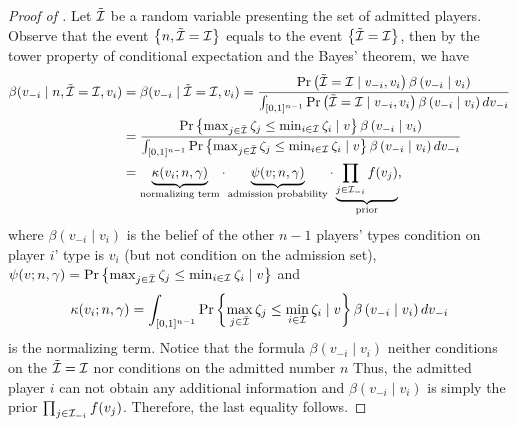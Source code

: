\begin{proof}[Proof of ] Let
$\tilde{\mathcal{I}}$ be a random variable presenting the set of admitted players. Observe that the event $\left\{n, \tilde{\mathcal{I}}= \mathcal{I}\right\}$ equals to the event $\left\{\tilde{\mathcal{I}}= \mathcal{I}\right\}$, then by the tower property of conditional expectation and the Bayes' theorem, we have
\begin{align*}
 \beta(v_{-i}\mid n,\tilde{\mathcal{I}}=\mathcal{I},v_i) &=  \beta(v_{-i}\mid\tilde{\mathcal{I}}= \mathcal{I},v_i)  = \frac{\Pr\left(\tilde{\mathcal{I}}=\mathcal{I}\mid v_{-i}, v_i\right)\beta\left(v_{-i} \mid v_i\right)}{\int_{[0,1]^{n-1}}\Pr\left(\tilde{\mathcal{I}}=\mathcal{I}\mid v_{-i}, v_i\right)\beta\left(v_{-i} \mid v_i\right)dv_{-i}} \\
 &= \frac{\Pr\left\{
\max_{j\in \Bar{\mathcal{I}}} \zeta_j \leq \min_{i\in \mathcal{I}}\zeta_i
\mid v\right\}\beta\left(v_{-i} \mid v_i\right)}{\int_{[0,1]^{n-1}}\Pr\left\{
\max_{j\in \Bar{\mathcal{I}}} \zeta_j \leq \min_{i\in \mathcal{I}}\zeta_i
\mid v\right\}\beta\left(v_{-i} \mid v_i\right)dv_{-i}}\\
&=\underbrace{\kappa(v_i;n,\gamma)}_{\textrm{normalizing term}}
\cdot 
\underbrace{\psi(v;n,\gamma)}_{\textrm{admission probability}}
 \cdot 
 \underbrace{\prod_{j\in \mathcal{I}_{-i}} f(v_j)}_{\textrm{prior}},
\end{align*}
where $\beta\left(v_{-i} \mid v_i\right)$ is the belief of the other $n-1$ players' types condition on player $i$' type is $v_i$ (but not condition on the admission set), $\psi(v;n,\gamma)=  \Pr\left\{
\max_{j\in \Bar{\mathcal{I}}} \zeta_j \leq \min_{i\in \mathcal{I}}\zeta_i
\mid v\right\}$ and $$\kappa(v_i;n,\gamma) = \int_{[0,1]^{n-1}}\Pr\left\{
\max_{j\in \Bar{\mathcal{I}}} \zeta_j \leq \min_{i\in \mathcal{I}}\zeta_i
\mid v\right\}\beta\left(v_{-i} \mid v_i\right)dv_{-i}$$ is the normalizing term. Notice that the formula $\beta\left(v_{-i} \mid v_i\right)$ neither conditions on the $\tilde{\mathcal{I}}=\mathcal{I}$ nor conditions on the admitted number $n$
Thus, the admitted player $i$ can not obtain any additional information and $\beta\left(v_{-i} \mid v_i\right)$ is simply the prior $\prod_{j\in \mathcal{I}_{-i}} f(v_j)$.
Therefore, the last equality follows.


\end{proof}
